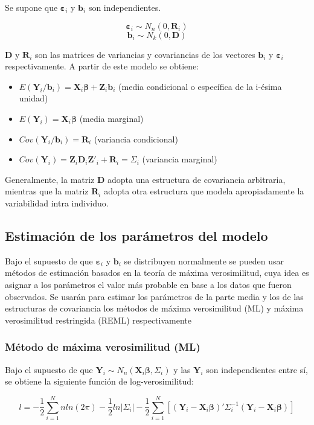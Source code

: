 \documentclass[spanish]{article}
\numberwithin{figure}{subsection}
\numberwithin{equation}{subsection}
\numberwithin{table}{subsection}
\begin{document}
Se supone que $\bm{\varepsilon}_i$ y $\bm{b}_i$ son independientes.

\[ \bm{\varepsilon}_i \sim N_{n}(0, \bm{R}_i) \]
\[ \bm{b}_i \sim N_k(0, \bm{D}) \]

$\bm{D}$ y $\bm{R}_i$ son las matrices de variancias y covariancias de los
vectores $\bm{b}_i$ y $\bm{\varepsilon}_i$ respectivamente. A partir de este
modelo se obtiene:

\begin{itemize}
	\item $E(\bm{Y}_i/\bm{b}_i) = \bm{X}_i\bm{\beta} + \bm{Z}_i\bm{b}_i$ (media condicional o específica de
	la i-ésima unidad)
	\item $E(\bm{Y}_i) = \bm{X}_i\bm{\beta}$ (media marginal)
	\item $Cov(\bm{Y}_i/\bm{b}_i) = \bm{R}_i$ (variancia condicional)
	\item $Cov(\bm{Y}_i) = \bm{Z}_i \bm{D}_i \bm{Z}'_i + \bm{R}_i = \bm{\varSigma}_i$ (variancia marginal)
\end{itemize}

Generalmente, la matriz $\bm{D}$ adopta una estructura de covariancia
arbitraria, mientras que la matriz $\bm{R}_i$ adopta otra estructura que modela
apropiadamente la variabilidad intra individuo.

\subsection{Estimación de los parámetros del modelo}

Bajo el supuesto de que $\bm{\varepsilon}_i$ y $\bm{b}_i$ se distribuyen normalmente se
pueden usar métodos de estimación basados en la teoría de máxima verosimilitud,
cuya idea es asignar a los parámetros el valor más probable en base a los datos
que fueron observados. Se usarán para estimar los parámetros de la parte media
y los de las estructuras de covariancia los métodos de máxima verosimilitud
(ML) y máxima verosimilitud restringida (REML) respectivamente

\subsubsection{Método de máxima verosimilitud (ML)}

Bajo el supuesto de que $\bm{Y}_i \sim N_n(\bm{X}_i \bm{\beta},
\bm{\varSigma}_i)$ y las $\bm{Y}_i$
son independientes entre sí, se obtiene la siguiente función de
log-verosimilitud:

\begin{equation}
\label{ML}
	l = -\frac{1}{2} \sum_{i=1}^{N}n ln(2\pi) - \frac{1}{2}ln|\bm{\varSigma}_i| -
	\frac{1}{2} \sum_{i=1}^{N} [(\bm{Y}_i - \bm{X}_i\bm{\beta})'
	\bm{\varSigma}_i^{-1} (\bm{Y}_i - \bm{X}_i\bm{\beta})]
\end{equation}
\end{document}
